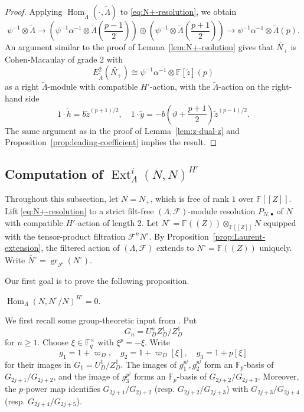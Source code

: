 \documentclass[11pt,a4paper]{article} %
\def\FF{\mathbb{F}}
\def\cF{\mathcal{F}}
\def\Ext{\operatorname{Ext}} %
\def\gr{\operatorname{gr}}
\def\Hom{\operatorname{Hom}}
\begin{document}
\begin{proof}
    Applying $\Hom_{\widetilde{\Lambda}}(\cdot,\widetilde{\Lambda})$ to \eqref{eq:N+-resolution}, we obtain
    \[
    \psi^{-1}\otimes\widetilde{\Lambda}\longrightarrow\left(\psi^{-1}\alpha^{-1}\otimes\widetilde{\Lambda}(\frac{p-1}{2})\right)\oplus\left(\psi^{-1}\otimes\widetilde{\Lambda}(\frac{p+1}{2})\right)\longrightarrow\psi^{-1}\alpha^{-1}\otimes\widetilde{\Lambda}(p).
    \]
    An argument similar to the proof of Lemma~\ref{lem:N+-rsolution} gives that $\widetilde{N_+}$ is Cohen-Macaulay of grade $2$ with 
    \[
    E^2_{\widetilde{\Lambda}}(\widetilde{N_+})\cong\psi^{-1}\alpha^{-1}\otimes\FF[\widetilde{z}](p)
    \]
    as a right $\widetilde{\Lambda}$-module with compatible $H'$-action, with the $\widetilde{\Lambda}$-action on the right-hand side 
    \[
    1\cdot\widetilde{h}=b\widetilde{z}^{(p+1)/2},\quad1\cdot\widetilde{y}=-b(\vartheta+\frac{p+1}{2})\widetilde{z}^{(p-1)/2}.
    \]
    The same argument as in the proof of Lemma~\ref{lem:z-dual-z} and Proposition~\ref{prop:leading-coefficient} implies the result.
\end{proof}

\subsection{Computation of \texorpdfstring{$\Ext^i_\Lambda(N,N)^{H'}$}{ExtiLambda(N,N)^{H'}}}

Throughout this subsection, let $N=N_+$, which is free of rank $1$ over $\FF[[Z]]$. Lift \eqref{eq:N+-resolution} to a strict filt-free $(\Lambda,\cF)$-module resolution $P_{N,\bullet}$ of $N$ with compatible $H'$-action of length 2. Let $N^\circ=\FF((Z))\otimes_{\FF[[Z]]}N$ equipped with the tensor-product filtration $\cF^nN^\circ$. By Proposition~\ref{prop:Laurent-extension}, the filtered action of $(\Lambda,\cF)$ extends to $N^\circ=\FF((Z))$ uniquely. Write $\widetilde{N^\circ}=\gr_{\cF}(N^\circ)$.

Our first goal is to prove the following proposition.

\begin{proposition}\label{prop:Hom-vanish}
    $\Hom_{\Lambda}(N,N^\circ/N)^{H'}=0$.
\end{proposition}
We first recall some group-theoretic input from \cite[\S~2.1, Proposition~2.1]{HW24b}. Put 
\[
G_n=U_D^nZ_D^1/Z_D^1
\]
for $n\ge1$. Choose $\xi\in\FF_q^\times$ with $\xi^p=-\xi$. Write 
\[
g_1=1+\varpi_D,\quad g_2=1+\varpi_D[\xi],\quad g_3=1+p[\xi]
\]
for their images in $G_1=U_D^1/Z_D^1$. The images of $g_1^{p^j},g_2^{p^j}$ form an $\FF_p$-basis of $G_{2j+1}/G_{2j+2}$, and the image of $g_3^{p^j}$ forms an $\FF_p$-basis of $G_{2j+2}/G_{2j+3}$. Moreover, the $p$-power map identifies $G_{2j+1}/G_{2j+2}$ (resp. $G_{2j+2}/G_{2j+3}$) with $G_{2j+3}/G_{2j+4}$ (resp. $G_{2j+4}/G_{2j+5}$). 
\end{document}
